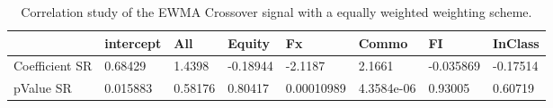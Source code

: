 \begin{table}[H]
\centering
\begin{tabular}{llllllll}
& intercept & All & Equity & Fx & Commo & FI & InClass \\ 
\hline 
Coefficient SR & 0.68429 & 1.4398 & -0.18944 & -2.1187 & 2.1661 & -0.035869 & -0.17514 \\ 
pValue SR & 0.015883 & 0.58176 & 0.80417 & 0.00010989 & 4.3584e-06 & 0.93005 & 0.60719 \\ 
\hline
\end{tabular}
\caption{Correlation study of the EWMA Crossover signal with a equally weighted weighting scheme.}
\label{MBBSEWOQ_CORR}
\end{table}